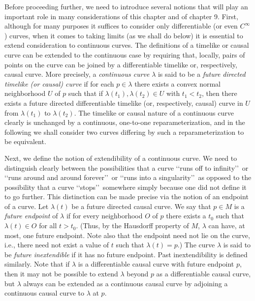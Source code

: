 Before proceeding further, we need to introduce several notions that will play an
important role in many considerations of this chapter and of chapter 9. First,
although for many purposes it suffices to consider only differentiable (or even
\(C^\infty\)) curves, when it comes to taking limits (as we shall do below) it is
essential to extend consideration to continuous curves. The definitions of a timelike
or causal curve can be extended to the continuous case by requiring that, locally,
pairs of points on the curve can be joined by a differentiable timelike or,
respectively, causal curve. More precisely, a \emph{continuous curve} \(\lambda\) is
said to be a \emph{future directed timelike (or causal) curve} if for each
\(p\in\lambda\) there exists a convex normal neighborhood \(U\) of \(p\) such that
if \(\lambda(t_1),\lambda(t_2)\in U\) with \(t_1<t_2\), then there exists a future
directed differentiable timelike (or, respectively, causal) curve in \(U\) from
\(\lambda(t_1)\) to \(\lambda(t_2)\). The timelike or causal nature of a continuous
curve clearly is unchanged by a continuous, one-to-one reparameterization, and in
the following we shall consider two curves differing by such a reparameterization to
be equivalent.

Next, we define the notion of extendibility of a continuous curve. We need to
distinguish clearly between the possibilities that a curve \lq\lq runs off to infinity\rq\rq\ or
\lq\lq runs around and around forever\rq\rq\ or \lq\lq runs into a singularity\rq\rq\ as opposed to
the possibility that a curve \lq\lq stops\rq\rq\ somewhere simply because one did not define it
to go further. This distinction can be made precise via the notion of an endpoint of a
curve. Let \(\lambda(t)\) be a future directed causal curve. We say that \(p\in M\)
is a \emph{future endpoint} of \(\lambda\) if for every neighborhood \(O\) of \(p\)
there exists a \(t_0\) such that \(\lambda(t)\in O\) for all \(t>t_0\). (Thus, by
the Hausdorff property of \(M\), \(\lambda\) can have, at most, one future endpoint.
Note also that the endpoint need not lie on the curve, i.e., there need not exist a
value of \(t\) such that \(\lambda(t)=p\).) The curve \(\lambda\) is said to be
\emph{future inextendible} if it has no future endpoint. Past inextendibility is
defined similarly. Note that if \(\lambda\) is a differentiable causal curve with future
endpoint \(p\), then it may not be possible to extend \(\lambda\) beyond \(p\) as a
differentiable causal curve, but \(\lambda\) always can be extended as a continuous
causal curve by adjoining a continuous causal curve to \(\lambda\) at \(p\).

